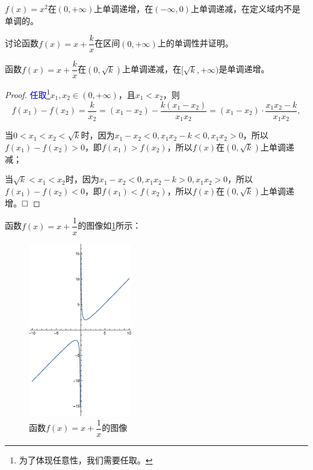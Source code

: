 \documentclass[lang=cn,math=cm,chinesefont=nofont,11pt,scheme=chinese,twocol]{elegantbook}
\begin{document}
\begin{example}
  $f(x)=x^2$在$(0,+\infty)$上单调递增，在$(-\infty,0)$上单调递减，在定义域内不是单调的。
\end{example}

\begin{spacing}{1.8}
  \begin{example}
    讨论函数$f(x)=x+\dfrac{k}{x}$在区间$(0,+\infty)$上的单调性并证明。
  \end{example}

  \begin{solution}
    函数$f(x)=x+\dfrac{k}{x}$在$(0,\sqrt{k})$上单调递减，在$[\sqrt{k},+\infty)$是单调递增。
  \end{solution}

  \begin{proof}
    \textcolor{blue}{任取}\footnote{为了体现任意性，我们需要任取。}$x_1,x_2\in (0,+\infty)$，且$x_1<x_2$，则$$f(x_1)-f(x_2)=\dfrac{k}{x_2}=(x_1-x_2)-\dfrac{k(x_1-x_2)}{x_1 x_2}=(x_1-x_2)\cdot \dfrac{x_1x_2-k}{x_1x_2},$$

    当$0<x_1<x_2<\sqrt{k}$时，因为$x_1-x_2<0,x_1x_2-k<0,x_1x_2>0$，所以$f(x_1)-f(x_2)>0$，即$f(x_1)>f(x_2)$，所以$f(x)$在$(0,\sqrt{k})$上单调递减；

    当$\sqrt{k}<x_1<x_2$时，因为$x_1-x_2<0,x_1x_2-k>0,x_1x_2>0$，所以$f(x_1)-f(x_2)<0$，即$f(x_1)<f(x_2)$，所以$f(x)$在$(0,\sqrt{k})$上单调递增。$\hfill\square$
  \end{proof}

\end{spacing}

\begin{remark}
  函数$f(x)=x+\dfrac{1}{x}$的图像如\ref{img:2.2.2function}所示：
\end{remark}

\begin{figure}[h]
  \centering
  \includegraphics[width=0.4\textwidth]{image/2.2.2function.eps}
  \caption{函数$f(x)=x+\dfrac{1}{x}$的图像}
  \label{img:2.2.2function}
\end{figure}
\end{document}
